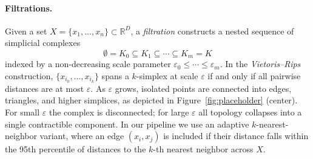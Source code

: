 \begin{figure}[H]
\centering
\begin{minipage}{.45\textwidth}
  \centering
  
  \label{fig:test1}
\end{minipage}\hfill
\begin{minipage}{.45\textwidth}
  \centering

  \label{fig:test2}
\end{minipage}
\end{figure}

\paragraph{Filtrations.}
Given a set $X = \{x_1, \ldots, x_n\} \subset \mathbb{R}^D$,
a \emph{filtration} constructs a nested sequence of simplicial complexes
\begin{equation}
    \emptyset = K_0 \subseteq K_1 \subseteq \cdots \subseteq K_m = K
    \label{eq:filtration}
\end{equation}
indexed by a non-decreasing scale parameter $\varepsilon_0 \leq \cdots
\leq \varepsilon_m$. In the \emph{Vietoris--Rips} construction,
$\{x_{i_0}, \ldots, x_{i_k}\}$ spans a $k$-simplex at scale $\varepsilon$
if and only if all pairwise distances are at most $\varepsilon$. As
$\varepsilon$ grows, isolated points are connected into edges, triangles,
and higher simplices, as depicted in Figure~\ref{fig:placeholder}
(center). For small $\varepsilon$ the complex is disconnected; for large
$\varepsilon$ all topology collapses into a single contractible component.
In our pipeline we use an adaptive $k$-nearest-neighbor variant, where
an edge $(x_i, x_j)$ is included if their distance falls within the
95th percentile of distances to the $k$-th nearest neighbor across $X$.

